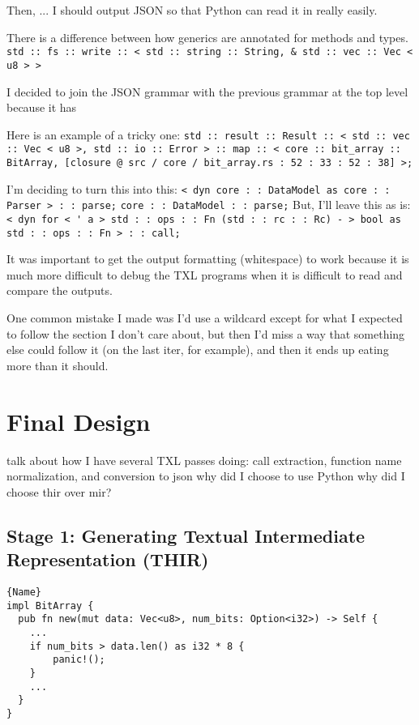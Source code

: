 \documentclass[11pt]{article}
\begin{document}
Then, ... I should output JSON so that Python can read it in really easily.

There is a difference between how generics are annotated for methods and types.
\lstinline{std :: fs :: write :: < std :: string :: String, & std :: vec :: Vec < u8 > >}

I decided to join the JSON grammar with the previous grammar at the top level because it has 

Here is an example of a tricky one:
\lstinline{std :: result :: Result :: < std :: vec :: Vec < u8 >, std :: io :: Error > :: map :: < core :: bit_array :: BitArray, [closure @ src / core / bit_array.rs : 52 : 33 : 52 : 38] >;}

I'm deciding to turn this into this:
\lstinline{< dyn core : : DataModel as core : : Parser > : : parse;}
\lstinline{core : : DataModel : : parse;}
But, I'll leave this as is:
\lstinline{< dyn for < ' a > std : : ops : : Fn (std : : rc : : Rc) - > bool as std : : ops : : Fn > : : call;}

It was important to get the output formatting (whitespace) to work because it is much more difficult to debug the TXL programs when it is difficult to read and compare the outputs.


One common mistake I made was I'd use a wildcard except for what I expected to follow the section I don't care about, but then I'd miss a way that something else could follow it (on the last iter, for example), and then it ends up eating more than it should.

\section{Final Design} %
talk about how I have several TXL passes doing: call extraction, function name normalization, and conversion to json
why did I choose to use Python
why did I choose thir over mir?

\subsection{Stage 1: Generating Textual Intermediate Representation (THIR)}



\begin{lstlisting}[caption=Rust Code, label=code:rust_code]{Name}
impl BitArray {
  pub fn new(mut data: Vec<u8>, num_bits: Option<i32>) -> Self {
    ...
    if num_bits > data.len() as i32 * 8 {
        panic!();
    }
    ...
  }
}
\end{lstlisting}
\end{document}
